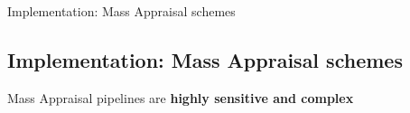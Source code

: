 \documentclass[aspectratio=169,10pt]{beamer}
\begin{document}
\newcommand{\frameH}{Implementation: Mass Appraisal schemes}
\begin{frame}{\frameH}
\subsection{\frameH}


\begin{block}{ Mass Appraisal pipelines are \textbf{highly sensitive and complex}}





\end{block}
\end{frame}
\end{document}
